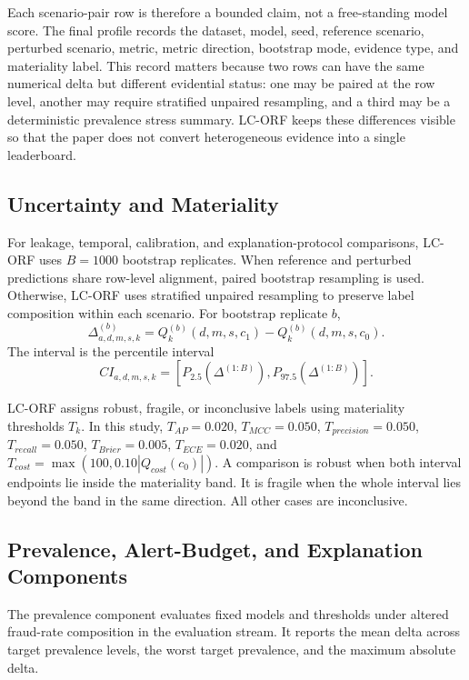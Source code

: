\documentclass{ieeeaccess}
\begin{document}
Each scenario-pair row is therefore a bounded claim, not a free-standing model score. The final profile records the dataset, model, seed, reference scenario, perturbed scenario, metric, metric direction, bootstrap mode, evidence type, and materiality label. This record matters because two rows can have the same numerical delta but different evidential status: one may be paired at the row level, another may require stratified unpaired resampling, and a third may be a deterministic prevalence stress summary. LC-ORF keeps these differences visible so that the paper does not convert heterogeneous evidence into a single leaderboard.

\subsection{Uncertainty and Materiality}
For leakage, temporal, calibration, and explanation-protocol comparisons, LC-ORF uses $B=1000$ bootstrap replicates. When reference and perturbed predictions share row-level alignment, paired bootstrap resampling is used. Otherwise, LC-ORF uses stratified unpaired resampling to preserve label composition within each scenario. For bootstrap replicate $b$,
\begin{equation}
\Delta^{(b)}_{a,d,m,s,k}
= Q^{(b)}_k(d,m,s,c_1) - Q^{(b)}_k(d,m,s,c_0).
\end{equation}
The interval is the percentile interval
\begin{equation}
CI_{a,d,m,s,k}
= [P_{2.5}(\Delta^{(1:B)}), P_{97.5}(\Delta^{(1:B)})].
\end{equation}

LC-ORF assigns robust, fragile, or inconclusive labels using materiality thresholds $T_k$. In this study, $T_{AP}=0.020$, $T_{MCC}=0.050$, $T_{precision}=0.050$, $T_{recall}=0.050$, $T_{Brier}=0.005$, $T_{ECE}=0.020$, and $T_{cost}=\max(100,0.10|Q_{cost}(c_0)|)$. A comparison is robust when both interval endpoints lie inside the materiality band. It is fragile when the whole interval lies beyond the band in the same direction. All other cases are inconclusive.

\subsection{Prevalence, Alert-Budget, and Explanation Components}
The prevalence component evaluates fixed models and thresholds under altered fraud-rate composition in the evaluation stream. It reports the mean delta across target prevalence levels, the worst target prevalence, and the maximum absolute delta.
\end{document}

